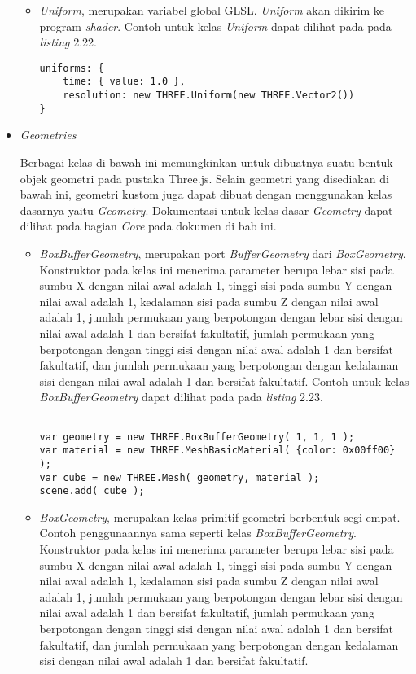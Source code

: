 \begin{itemize}
\begin{itemize}
	\item{\it Uniform}, merupakan variabel global GLSL. {\it Uniform} akan dikirim ke program {\it shader}. Contoh untuk kelas {\it Uniform} dapat dilihat pada pada {\it listing} 2.22.
	
\begin{lstlisting}[caption={Contoh penggunaan kelas {\it Uniform} yang diinisialisasi dengan nilai atau objek.},captionpos=b]
uniforms: {
	time: { value: 1.0 },
	resolution: new THREE.Uniform(new THREE.Vector2())
}
\end{lstlisting}
	
	\end{itemize}
	
\item \textit{Geometries}

Berbagai kelas di bawah ini memungkinkan untuk dibuatnya suatu bentuk objek geometri pada pustaka Three.js. Selain geometri yang disediakan di bawah ini, geometri kustom juga dapat dibuat dengan menggunakan kelas dasarnya yaitu {\it Geometry}. Dokumentasi untuk kelas dasar {\it Geometry} dapat dilihat pada bagian {\it Core} pada dokumen di bab ini.
	\begin{itemize}
	\item {\it BoxBufferGeometry}, merupakan port {\it BufferGeometry} dari {\it BoxGeometry}. Konstruktor pada kelas ini menerima parameter berupa lebar sisi pada sumbu X dengan nilai awal adalah 1, tinggi sisi pada sumbu Y dengan nilai awal adalah 1, kedalaman sisi pada sumbu Z dengan nilai awal adalah 1, jumlah permukaan yang berpotongan dengan lebar sisi dengan nilai awal adalah 1 dan bersifat fakultatif,  jumlah permukaan yang berpotongan dengan tinggi sisi dengan nilai awal adalah 1 dan bersifat fakultatif,  dan jumlah permukaan yang berpotongan dengan kedalaman sisi dengan nilai awal adalah 1 dan bersifat fakultatif. Contoh untuk kelas {\it BoxBufferGeometry} dapat dilihat pada pada {\it listing} 2.23.
	
\begin{lstlisting}[caption={Contoh penggunaan kelas {\it BoxBufferGeometry}.},captionpos=b]

var geometry = new THREE.BoxBufferGeometry( 1, 1, 1 );
var material = new THREE.MeshBasicMaterial( {color: 0x00ff00} );
var cube = new THREE.Mesh( geometry, material );
scene.add( cube );
\end{lstlisting}

	\item {\it BoxGeometry}, merupakan kelas primitif geometri berbentuk segi empat. Contoh penggunaannya sama seperti kelas {\it BoxBufferGeometry}. Konstruktor pada kelas ini menerima parameter berupa lebar sisi pada sumbu X dengan nilai awal adalah 1, tinggi sisi pada sumbu Y dengan nilai awal adalah 1, kedalaman sisi pada sumbu Z dengan nilai awal adalah 1, jumlah permukaan yang berpotongan dengan lebar sisi dengan nilai awal adalah 1 dan bersifat fakultatif,  jumlah permukaan yang berpotongan dengan tinggi sisi dengan nilai awal adalah 1 dan bersifat fakultatif,  dan jumlah permukaan yang berpotongan dengan kedalaman sisi dengan nilai awal adalah 1 dan bersifat fakultatif.
	

\end{itemize}
\end{itemize}
